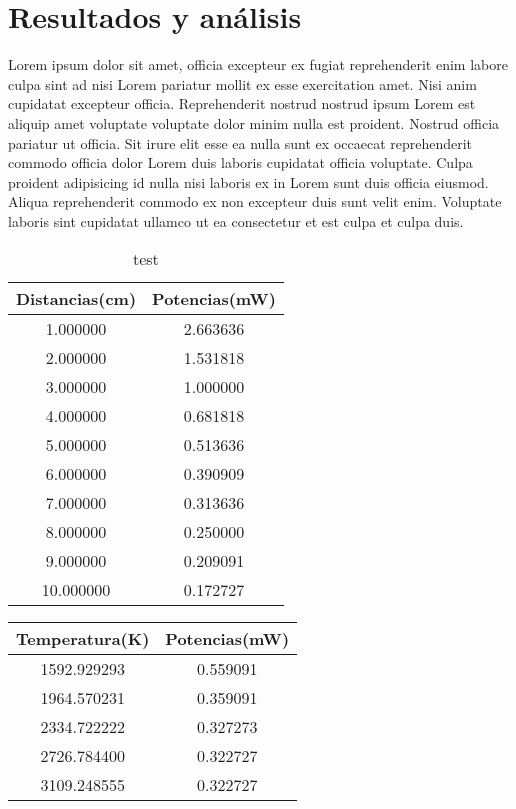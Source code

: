 \section{Resultados y análisis}
Lorem ipsum dolor sit amet, officia excepteur ex fugiat reprehenderit enim labore culpa sint ad nisi Lorem pariatur mollit ex esse exercitation amet. Nisi anim cupidatat excepteur officia. Reprehenderit nostrud nostrud ipsum Lorem est aliquip amet voluptate voluptate dolor minim nulla est proident. Nostrud officia pariatur ut officia. Sit irure elit esse ea nulla sunt ex occaecat reprehenderit commodo officia dolor Lorem duis laboris cupidatat officia voluptate. Culpa proident adipisicing id nulla nisi laboris ex in Lorem sunt duis officia eiusmod. Aliqua reprehenderit commodo ex non excepteur duis sunt velit enim. Voluptate laboris sint cupidatat ullamco ut ea consectetur et est culpa et culpa duis.

\begin{table}[!h]
	\centering
	\begin{tabular}{|c|c|}
		\hline
		Distancias(cm) & Potencias(mW) \\
		\hline
		1.000000       & 2.663636      \\
		2.000000       & 1.531818      \\
		3.000000       & 1.000000      \\
		4.000000       & 0.681818      \\
		5.000000       & 0.513636      \\
		6.000000       & 0.390909      \\
		7.000000       & 0.313636      \\
		8.000000       & 0.250000      \\
		9.000000       & 0.209091      \\
		10.000000      & 0.172727      \\
		\hline
	\end{tabular}
	\caption{test}
\end{table}

\begin{table}[!h]
	\centering
	\begin{tabular}{|c|c|}
		\hline
		Temperatura(K) & Potencias(mW) \\
		\hline
		1592.929293    & 0.559091      \\
		1964.570231    & 0.359091      \\
		2334.722222    & 0.327273      \\
		2726.784400    & 0.322727      \\
		3109.248555    & 0.322727      \\
		\hline
	\end{tabular}
\end{table}
